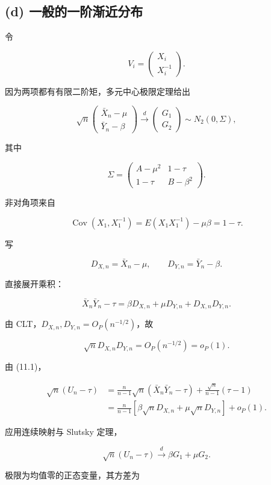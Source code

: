 \subsection{(d) 一般的一阶渐近分布}

令

\[
V_i=\begin{pmatrix}X_i\\X_i^{-1}\end{pmatrix}.
\]

因为两项都有有限二阶矩，多元中心极限定理给出

\[
\sqrt n
\begin{pmatrix}
\bar X_n-\mu\\
\bar Y_n-\beta
\end{pmatrix}
\xrightarrow{d}
\begin{pmatrix}G_1\\G_2\end{pmatrix}
\sim N_2(0,\Sigma),
\]

其中

\[
\Sigma=
\begin{pmatrix}
A-\mu^2 & 1-\tau\\
1-\tau & B-\beta^2
\end{pmatrix}.
\tag{11.6}
\]

非对角项来自

\[
\operatorname{Cov}(X_1,X_1^{-1})
=E(X_1X_1^{-1})-\mu\beta=1-\tau.
\]

写

\[
D_{X,n}=\bar X_n-\mu,\qquad
D_{Y,n}=\bar Y_n-\beta.
\]

直接展开乘积：

\[
\bar X_n\bar Y_n-\tau
=\beta D_{X,n}+\mu D_{Y,n}+D_{X,n}D_{Y,n}.
\tag{11.7}
\]

由 CLT，$D_{X,n},D_{Y,n}=O_P(n^{-1/2})$，故

\[
\sqrt n D_{X,n}D_{Y,n}=O_P(n^{-1/2})=o_P(1).
\]

由 (11.1)，

\[
\begin{aligned}
\sqrt n(U_n-\tau)
&=\frac n{n-1}\sqrt n(\bar X_n\bar Y_n-\tau)
+\frac{\sqrt n}{n-1}(\tau-1)\\
&=\frac n{n-1}
\left[\beta\sqrt n D_{X,n}+\mu\sqrt n D_{Y,n}\right]+o_P(1).
\end{aligned}
\]

应用连续映射与 Slutsky 定理，

\[
\sqrt n(U_n-\tau)\xrightarrow d\beta G_1+\mu G_2.
\]

极限为均值零的正态变量，其方差为


